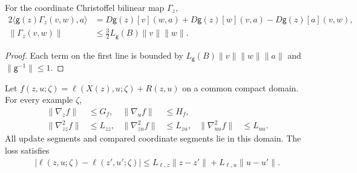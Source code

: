 \begin{proposition}
For the coordinate Christoffel bilinear map $\Gamma_z$,
\begin{align}
 2\langle\mathsf g(z)\Gamma_z(v,w),a\rangle
 &=D\mathsf g(z)[v](w,a)+D\mathsf g(z)[w](v,a)
 -D\mathsf g(z)[a](v,w),\\
 \|\Gamma_z(v,w)\|&\le\tfrac32L_{\mathsf g}(B)\|v\|\|w\|.
\end{align}
\end{proposition}
\begin{proof}
Each term on the first line is bounded by
$L_{\mathsf g}(B)\|v\|\|w\|\|a\|$ and $\|\mathsf g^{-1}\|\le1$.
\end{proof}

\begin{assumption}
\label{ass:stability-new}
Let $f(z,u;\zeta)=\ell(X(z),u;\zeta)+R(z,u)$ on a common compact domain.
For every example $\zeta$,
\begin{align}
 \|\nabla_zf\|&\le G_f,&\|\nabla_uf\|&\le H_f,\\
 \|\nabla_{zz}^2f\|&\le L_{zz},&\|\nabla_{zu}^2f\|&\le L_{zu},&
 \|\nabla_{uu}^2f\|&\le L_{uu}.
\end{align}
All update segments and compared coordinate segments lie in this domain.
The loss satisfies
\begin{align}
 |\ell(z,u;\zeta)-\ell(z',u';\zeta)|
 \le L_{\ell,z}\|z-z'\|+L_{\ell,u}\|u-u'\|.
\end{align}
\end{assumption}

